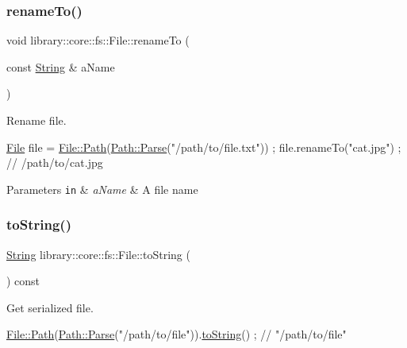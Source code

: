 \subsubsection{\texorpdfstring{rename\+To()}{renameTo()}}
{\footnotesize\ttfamily void library\+::core\+::fs\+::\+File\+::rename\+To (\begin{DoxyParamCaption}\item[{const \hyperlink{classlibrary_1_1core_1_1types_1_1_string}{String} \&}]{a\+Name }\end{DoxyParamCaption})}



Rename file. 


\begin{DoxyCode}
\hyperlink{classlibrary_1_1core_1_1fs_1_1_file_a6f3f0d79545ac9984c6f49432f0c6c39}{File} file = \hyperlink{classlibrary_1_1core_1_1fs_1_1_file_a72d6cdf8bb7e299889c6149e2b8a6cc7}{File::Path}(\hyperlink{classlibrary_1_1core_1_1fs_1_1_path_a6ba644b6609507e724c217bf2020f5ae}{Path::Parse}(\textcolor{stringliteral}{"/path/to/file.txt"})) ;
file.renameTo(\textcolor{stringliteral}{"cat.jpg"}) ; \textcolor{comment}{// /path/to/cat.jpg}
\end{DoxyCode}



\begin{DoxyParams}[1]{Parameters}
\mbox{\tt in}  & {\em a\+Name} & A file name \\
\hline
\end{DoxyParams}
\mbox{\label{classlibrary_1_1core_1_1fs_1_1_file_a891360e0ec67f357b528b3a1827d8c21}} 
\subsubsection{\texorpdfstring{to\+String()}{toString()}}
{\footnotesize\ttfamily \hyperlink{classlibrary_1_1core_1_1types_1_1_string}{String} library\+::core\+::fs\+::\+File\+::to\+String (\begin{DoxyParamCaption}{ }\end{DoxyParamCaption}) const}



Get serialized file. 


\begin{DoxyCode}
\hyperlink{classlibrary_1_1core_1_1fs_1_1_file_a72d6cdf8bb7e299889c6149e2b8a6cc7}{File::Path}(\hyperlink{classlibrary_1_1core_1_1fs_1_1_path_a6ba644b6609507e724c217bf2020f5ae}{Path::Parse}(\textcolor{stringliteral}{"/path/to/file"})).\hyperlink{classlibrary_1_1core_1_1fs_1_1_file_a891360e0ec67f357b528b3a1827d8c21}{toString}() ; \textcolor{comment}{// "/path/to/file"}
\end{DoxyCode}


